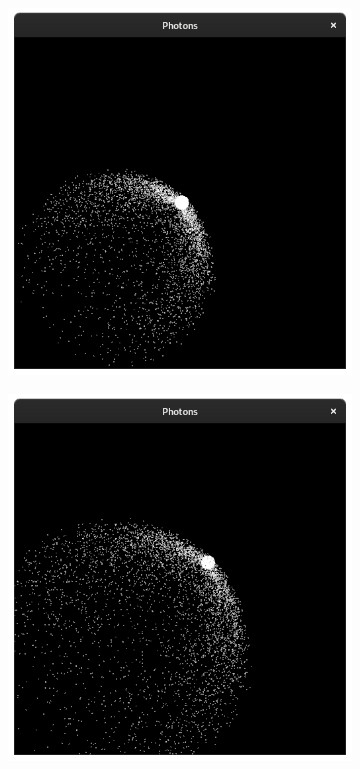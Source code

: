 \documentclass{stdlocal}
\begin{document}
\begin{figure}[p]
\begin{subfigure}[b]{0.24\textwidth}
      \end{subfigure}
      \begin{subfigure}[b]{0.24\textwidth}
        \center
        \includegraphics[width=\textwidth,trim={0 0 0 2cm},clip]{images/photons_1_05.png}
      \end{subfigure}
      \begin{subfigure}[b]{0.24\textwidth}
        \center
        \includegraphics[width=\textwidth,trim={0 0 0 2cm},clip]{images/photons_1_06.png}

\end{subfigure}
\end{figure}
\end{document}
